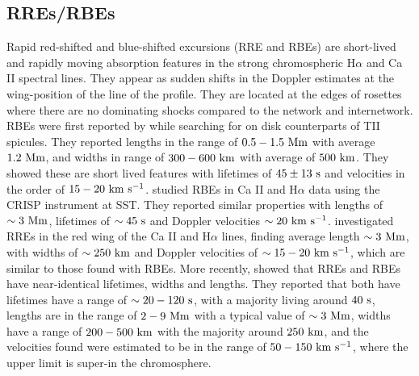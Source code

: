 \subsection{RREs/RBEs}
\label{subsec:rbe}
Rapid red-shifted and blue-shifted excursions (RRE and RBEs) are short-lived and rapidly moving absorption features in the strong chromospheric H$\alpha$ and Ca II spectral lines. They appear as sudden shifts in the Doppler estimates at the wing-position of the line of the profile. They are located at the edges of rosettes where there are no dominating shocks compared to the network and internetwork. RBEs were first reported by \cite{Langangen2008ApJ} while searching for on disk counterparts of TII spicules. They reported lengths in the range of $0.5-1.5~\rm{Mm}$ with average $1.2~\rm{Mm}$, and widths in range of $300-600~\rm{km}$ with average of $500~\rm{km}$. They showed these are short lived features with lifetimes of $45\pm13~\rm{s}$ and velocities in the order of $15-20~\rm{km ~s^{-1}}$. \cite{Rouppe2009ApJ} studied RBEs in Ca II and H$\alpha$ data using the CRISP instrument at SST. They reported similar properties with lengths of $\sim 3~\rm{Mm}$, lifetimes of $\sim 45~\rm{s}$ and Doppler velocities $\sim 20~\rm{km ~s^{-1}}$. \cite{Sekse2013ApJ76944S,Sekse2013ApJ764164S} investigated RREs in the red wing of the  Ca II and H$\alpha$ lines, finding average length $\sim 3~\rm{Mm}$, with widths of $\sim 250~\rm{km}$ and Doppler velocities of $\sim 15-20~\rm{km ~s^{-1}}$, which are similar to those found with RBEs.  More recently, \cite{Kuridze2015ApJ80226K} showed that RREs and RBEs have near-identical lifetimes, widths and lengths. They reported that both have lifetimes have a range of $\sim 20-120~\rm{s}$, with a majority living around $40~\rm{s}$, lengths are in the range of $2-9~\rm{Mm}$ with a typical value of $\sim 3~\rm{Mm}$, widths have a range of $200-500~\rm{km}$ with the majority around $250~\rm{km}$, and the velocities found were estimated to be in the range of $50-150~\rm{km ~s^{-1}}$, where the upper limit is super-\Alfvenic in the chromosphere. \np
%

